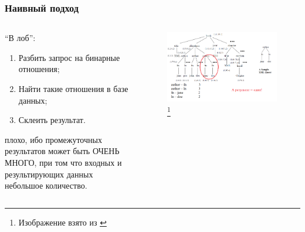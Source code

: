 \documentclass{beamer}
\begin{document}
\begin{frame}
\frametitle{Наивный подход}

\begin{columns}
\begin{column}{0.25\textwidth}
{ \footnotesize
``В лоб'':
\begin{enumerate}
  \item Разбить запрос на бинарные отношения;
  \item Найти такие отношения в базе данных;
  \item Склеить результат.
\end{enumerate}

плохо, ибо промежуточных результатов может быть ОЧЕНЬ МНОГО, при том что входных и результирующих данных небольшое количество.
}
\end{column}
\begin{column}{0.75\textwidth}  %

\begin{figure}[htb]
\includegraphics[width=\textwidth,height=0.65\textheight,keepaspectratio]{xmlalg-statistics.png} 
\footnote{\tiny{Изображение взято из \cite{Bruno2002}}}
\end{figure}    

\end{column}
\end{columns}
\end{frame}
\end{document}
